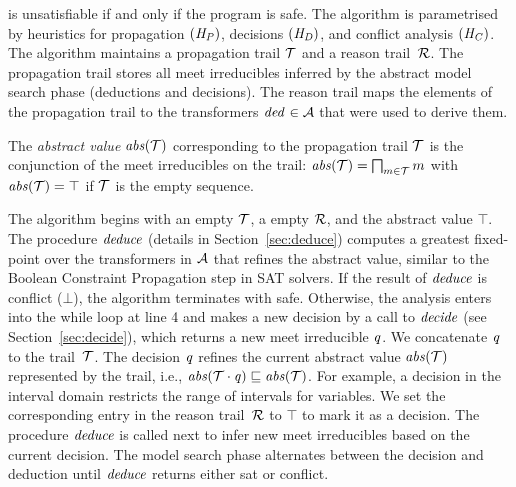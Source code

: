 is unsatisfiable if and only if the program is safe.  
The algorithm is parametrised by heuristics for propagation $(\mathit{H_P})$, 
decisions $(\mathit{H_D})$, and conflict analysis $(\mathit{H_C})$.
The algorithm maintains a propagation trail $\mathcal{T}$ and 
a reason trail~$\mathcal{R}$.
The propagation trail stores all meet irreducibles inferred by 
the abstract model search phase (deductions and decisions).  
The reason trail maps the elements of the propagation trail to the
transformers $\mathit{ded}^{}\in\mathcal{A}$ that were used to
derive them. 
%
\begin{definition} 
The \emph{abstract value} $\mathit{abs}(\mathcal{T})$ corresponding to 
the propagation trail $\mathcal{T}$ is the conjunction of the 
meet irreducibles on the trail:
$\mathit{abs}(\mathcal{T})=\bigsqcap_{m \in \mathcal{T}}m$ with
$\mathit{abs}(\mathcal{T})=\top$ if $\mathcal{T}$ is the empty sequence.
\end{definition}
%
The algorithm begins with an empty $\mathcal{T}$, a empty $\mathcal{R}$, and the
abstract value $\top$.  The procedure $\mathit{deduce}$ (details in
Section~\ref{sec:deduce}) computes a greatest fixed-point over the
transformers in $\mathcal{A}$ that refines the abstract value,
similar to the Boolean Constraint Propagation
step in SAT solvers.  If the result of $\mathit{deduce}$
is \textsf{conflict} ($\bot$), the algorithm terminates with
\textsf{safe}.  Otherwise, the analysis enters into the while loop at line 4
and makes a new decision by a call to $\mathit{decide}$ (see
Section~\ref{sec:decide}), which returns a new meet irreducible
$\mathit{q}$.
%
%
We concatenate $\mathit{q}$ to the trail~$\mathcal{T}$.  The decision
$\mathit{q}$ refines the current abstract value $\mathit{abs}(\mathcal{T})$ represented
by the trail, i.e., $\mathit{abs}(\mathcal{T}\cdot\mathit{q})\sqsubseteq \mathit{abs}(\mathcal{T})$.
%
%
For example, a decision in the interval domain restricts the range of 
intervals for variables.
%
We set the corresponding entry in the reason trail~$\mathcal{R}$ to $\top$
to mark it as a decision.
%
The procedure $\mathit{deduce}$ is called next to infer new meet irreducibles
based on the current decision.  The model search phase
alternates between the decision and deduction until $\mathit{deduce}$ returns
either \textsf{sat} or \textsf{conflict}.  

